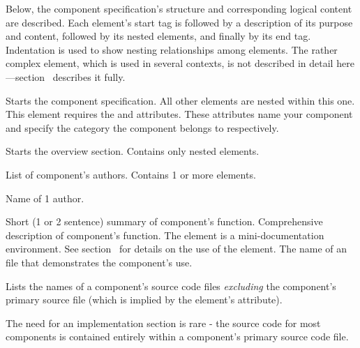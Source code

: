 \documentclass[11pt]{article}
\begin{document}
Below, the component specification's \xml{} structure and corresponding
logical content are described.  Each element's start tag is followed by a
description of its purpose and content, followed by its nested elements,
and finally by its end tag.  Indentation is used to show nesting
relationships among elements.  The rather complex 
element, which is used in several contexts, is not described in detail
here---section~\sechyperref{\SUBSECdescElement} describes it fully.

\begin{description}
   Starts the component specification.  All
  other elements are nested within this one.  This element requires the
   and  attributes.  These
  attributes name your component and specify
  the category the component belongs to respectively.
  \begin{description}
     Starts the overview section.  Contains only
    nested elements.
    \begin{description}
        List of component's authors.  Contains 1 or more
       elements.
      \begin{description}
         Name of 1 author.
      \end{description}
       Short (1 or 2 sentence) summary of component's
      function. 
       Comprehensive description of component's
      function.  The  element is a mini-documentation
      environment.  See
      section~\sechyperref{\SUBSECdescElement}
      for details on the use of the  element.
       The name of an  file that
      demonstrates the component's use.
    \end{description}
     Lists the names of
    a component's source code files \emph{excluding} the component's
    primary source file (which is implied by the 
    element's  attribute).
    
    The need for an implementation section is rare - the source code for
    most components is contained entirely within a component's primary 
    source code file.
    

\end{description}
\end{description}
\end{document}

